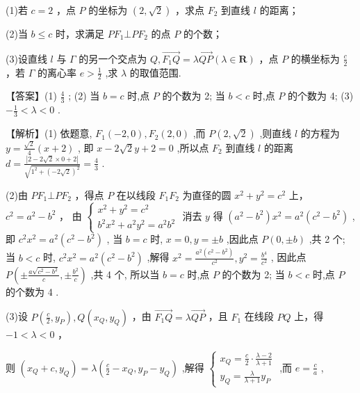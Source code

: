 \documentclass[10pt]{article}
\begin{document}
(1)若 \(c = 2\) ，点 \(P\) 的坐标为 \(\left( {2,\sqrt{2}}\right)\) ，求点 \({F}_{2}\) 到直线 \(l\) 的距离；

(2)当 \(b \leq  c\) 时，求满足 \(P{F}_{1} \bot  P{F}_{2}\) 的点 \(P\) 的个数；

(3)设直线 \(l\) 与 \(\Gamma\) 的另一个交点为 \(Q,\overrightarrow{{F}_{1}Q} = \lambda \overrightarrow{QP}\left( {\lambda  \in  \mathbf{R}}\right)\) ，点 \(P\) 的横坐标为 \(\frac{c}{2}\) ，若 \(\Gamma\) 的离心率 \(e > \frac{1}{2}\) ,求 \(\lambda\) 的取值范围.

【答案】(1) \(\frac{4}{3}\) ; (2) 当 \(b = c\) 时,点 \(P\) 的个数为 2; 当 \(b < c\) 时,点 \(P\) 的个数为 4; (3) \(- \frac{1}{3} < \lambda  < 0\) .

【解析】(1) 依题意, \({F}_{1}\left( {-2,0}\right) ,{F}_{2}\left( {2,0}\right)\) ,而 \(P\left( {2,\sqrt{2}}\right)\) ,则直线 \(l\) 的方程为 \(y = \frac{\sqrt{2}}{4}\left( {x + 2}\right)\) , 即 \(x - 2\sqrt{2}y + 2 = 0\) ,所以点 \({F}_{2}\) 到直线 \(l\) 的距离 \(d = \frac{\left| 2 - 2\sqrt{2} \times  0 + 2\right| }{\sqrt{{1}^{2} + {\left( -2\sqrt{2}\right) }^{2}}} = \frac{4}{3}\) .

(2)由 \(P{F}_{1} \bot  P{F}_{2}\) ，得点 \(P\) 在以线段 \({F}_{1}{F}_{2}\) 为直径的圆 \({x}^{2} + {y}^{2} = {c}^{2}\) 上， \({c}^{2} = {a}^{2} - {b}^{2}\) ， 由 \(\left\{  \begin{array}{l} {x}^{2} + {y}^{2} = {c}^{2} \\  {b}^{2}{x}^{2} + {a}^{2}{y}^{2} = {a}^{2}{b}^{2} \end{array}\right.\) 消去 \(y\) 得 \(\left( {{a}^{2} - {b}^{2}}\right) {x}^{2} = {a}^{2}\left( {{c}^{2} - {b}^{2}}\right)\) ,即 \({c}^{2}{x}^{2} = {a}^{2}\left( {{c}^{2} - {b}^{2}}\right)\) , 当 \(b = c\) 时, \(x = 0,y =  \pm  b\) ,因此点 \(P\left( {0, \pm  b}\right)\) ,共 2 个; 当 \(b < c\) 时, \({c}^{2}{x}^{2} = {a}^{2}\left( {{c}^{2} - {b}^{2}}\right)\) ,解得 \({x}^{2} = \frac{{a}^{2}\left( {{c}^{2} - {b}^{2}}\right) }{{c}^{2}},{y}^{2} = \frac{{b}^{4}}{{c}^{2}}\) , 因此点 \(P\left( {\pm \frac{a\sqrt{{c}^{2} - {b}^{2}}}{c}, \pm  \frac{{b}^{2}}{c}}\right)\) ,共 4 个, 所以当 \(b = c\) 时,点 \(P\) 的个数为 2; 当 \(b < c\) 时,点 \(P\) 的个数为 4 .

(3)设 \(P\left( {\frac{c}{2},{y}_{P}}\right) ,Q\left( {{x}_{Q},{y}_{Q}}\right)\) ，由 \(\overrightarrow{{F}_{1}Q} = \lambda \overrightarrow{QP}\) ，且 \({F}_{1}\) 在线段 \({PQ}\) 上，得 \(- 1 < \lambda  < 0\) ，

则 \(\left( {{x}_{Q} + c,{y}_{Q}}\right)  = \lambda \left( {\frac{c}{2} - {x}_{Q},{y}_{P} - {y}_{Q}}\right)\) ,解得 \(\left\{  \begin{array}{l} {x}_{Q} = \frac{c}{2} \cdot  \frac{\lambda  - 2}{\lambda  + 1} \\  {y}_{Q} = \frac{\lambda }{\lambda  + 1}{y}_{P} \end{array}\right.\) ,而 \(e = \frac{c}{a}\) ,
\end{document}
